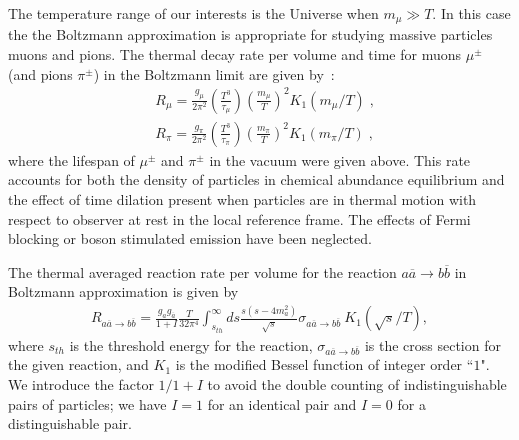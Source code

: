 The temperature range of our interests is the Universe when $m_\mu\gg T$. In this case the the Boltzmann approximation is appropriate for studying massive particles muons and pions. The thermal decay rate per volume and time  for muons $\mu^\pm$ (and pions $\pi^\pm$) in the Boltzmann limit  are given by~\cite{PhysRevC.82.035203}:
\begin{align}
&R_\mu=\frac{g_\mu}{2\pi^2}\left(\frac{T^3}{\tau_\mu}\right)\left(\frac{m_\mu}{T}\right)^2K_1(m_\mu/T)\;,\\
&R_\pi=\frac{g_\pi}{2\pi^2}\left(\frac{T^3}{\tau_\pi}\right)\left(\frac{m_\pi}{T}\right)^2K_1(m_\pi/T)\;, 
\end{align}
where the lifespan of $\mu^\pm$ and $\pi^\pm$ in the vacuum were given above. This rate accounts for both the density of particles in chemical abundance equilibrium and the effect of time dilation present when particles are in thermal motion with respect to observer at rest in the local reference frame. The effects of Fermi blocking or boson stimulated emission have been neglected.

The thermal averaged reaction rate per volume for the reaction $a\overline{a}\rightarrow b\overline{b}$ in Boltzmann approximation is given by \cite{Letessier:2002ony}
\begin{align}\label{pairR}
R_{a\overline{a}\rightarrow b\overline{b}}=\frac{g_ag_{\overline{a}}}{1+I}\frac{T}{32\pi^4}\int_{s_{th}}^\infty ds\frac{s(s-4m^2_a)}{\sqrt{s}}\sigma_{a\overline{a}\rightarrow b\overline{b}}~K_1(\sqrt{s}/T),
\end{align}
where $s_{th}$ is the threshold energy for the reaction, $\sigma_{a\overline{a}\rightarrow b\overline{b}}$ is the cross section for the given reaction, and $K_1$ is the modified
Bessel function of integer order ``$1$". We introduce the factor $1/1+I$ to avoid the double counting of indistinguishable pairs of particles; we have $I=1$ for an identical pair and $I=0$ for a distinguishable pair.

